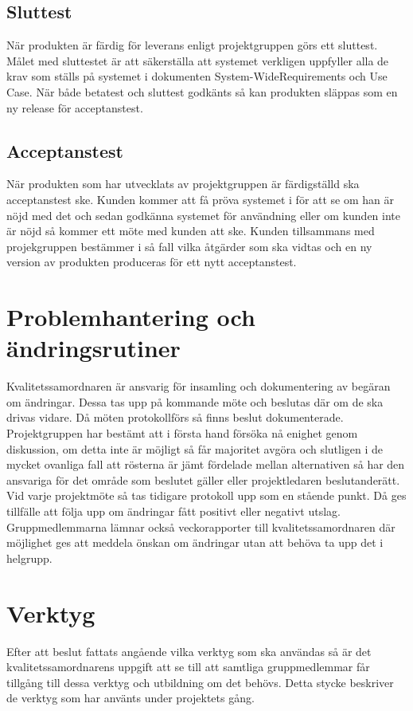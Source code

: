 \subsection{Sluttest}
När produkten är färdig för leverans enligt projektgruppen görs ett sluttest. Målet med sluttestet är att säkerställa att systemet verkligen uppfyller alla de krav som ställs på systemet i dokumenten System-WideRequirements och Use Case. När både betatest och sluttest godkänts så kan produkten släppas som en ny release för acceptanstest.

\subsection{Acceptanstest}
När produkten som har utvecklats av projektgruppen är färdigställd ska acceptanstest ske. Kunden kommer att få pröva systemet i för att se om han är nöjd med det och sedan godkänna systemet för användning eller om kunden inte är nöjd så kommer ett möte med kunden att ske. Kunden tillsammans med projekgruppen bestämmer i så fall vilka åtgärder som ska vidtas och en ny version av produkten produceras för ett nytt acceptanstest.

\section{Problemhantering och ändringsrutiner}
Kvalitetssamordnaren är ansvarig för insamling och dokumentering av begäran om ändringar. Dessa tas upp på kommande möte och beslutas där om de ska drivas vidare. Då möten protokollförs så finns beslut dokumenterade. Projektgruppen har bestämt att i första hand försöka nå enighet genom diskussion, om detta inte är möjligt så får majoritet avgöra och slutligen i de mycket ovanliga fall att rösterna är jämt fördelade mellan alternativen så har den ansvariga för det område som beslutet gäller eller projektledaren beslutanderätt. Vid varje projektmöte så tas tidigare protokoll upp som en stående punkt. Då ges tillfälle att följa upp om ändringar fått positivt eller negativt utslag. Gruppmedlemmarna lämnar också veckorapporter till kvalitetssamordnaren där möjlighet ges att meddela önskan om ändringar utan att behöva ta upp det i helgrupp.

\section{Verktyg}
Efter att beslut fattats angående vilka verktyg som ska användas så är det kvalitetssamordnarens uppgift att se till att samtliga gruppmedlemmar får tillgång till dessa verktyg och utbildning om det behövs. Detta stycke beskriver de verktyg som har använts under projektets gång.

